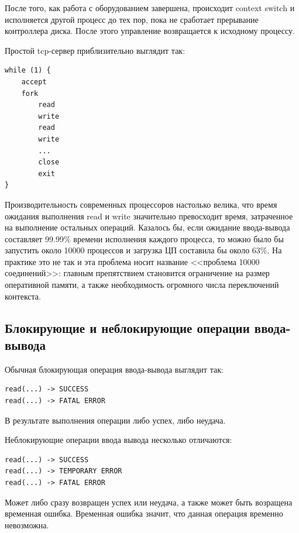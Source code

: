 После того, как работа с оборудованием завершена, происходит context switch и исполняется другой процесс до тех пор, пока не сработает прерывание контроллера диска. После этого управление возвращается к исходному процессу.

Простой tcp-сервер приблизительно выглядит так:
\begin{verbatim}
while (1) {
    accept
    fork
        read
        write
        read
        write
        ...
        close
        exit
}
\end{verbatim}
Производительность современных процессоров настолько велика, что время ожидания выполнения read и write значительно превосходит время, затраченное на выполнение остальных операций. Казалось бы, если ожидание ввода-вывода составляет 99.99\% времени исполнения каждого процесса, то можно было бы запустить около 10000 процессов и загрузка ЦП составила бы около 63\%. На практике это не так и эта проблема носит название <<проблема 10000 соединений>>: главным препятствием становится ограничение на размер оперативной памяти, а также необходимость огромного числа переключений контекста.

\subsection{Блокирующие и неблокирующие операции ввода-вывода}
Обычная блокирующая операция ввода-вывода выглядит так:
\begin{verbatim}
read(...) -> SUCCESS
read(...) -> FATAL ERROR
\end{verbatim}
В результате выполнения операции либо успех, либо неудача.

Неблокирующие операции ввода вывода несколько отличаются:
\begin{verbatim}
read(...) -> SUCCESS
read(...) -> TEMPORARY ERROR
read(...) -> FATAL ERROR
\end{verbatim}
Может либо сразу возвращен успех или неудача, а также может быть возращена временная ошибка. Временная ошибка значит, что данная операция временно невозможна.

